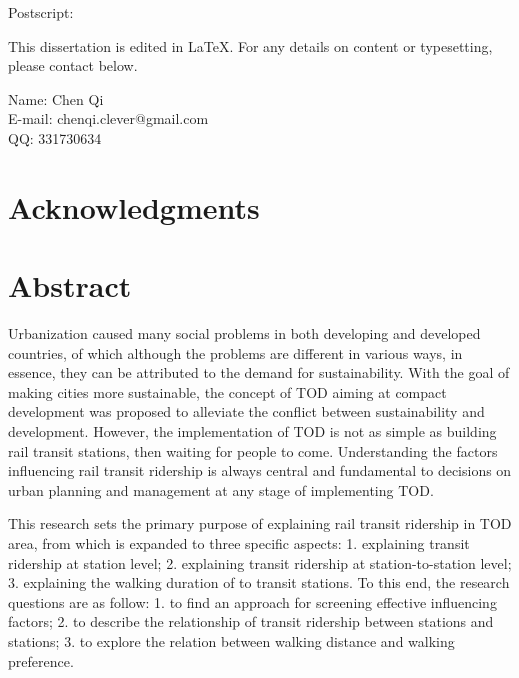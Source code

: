 \documentclass[12pt, twoside, a4paper]{book} %
\renewcommand{\baselinestretch}{1.5} %
\begin{document}
Postscript:

This dissertation is edited in \LaTeX. For any details on content or typesetting, please contact below.

\begin{flushright}
Name: Chen Qi \\
E-mail: chenqi.clever@gmail.com \\
QQ: 331730634 \\
\end{flushright}

\renewcommand{\baselinestretch}{1.2} %
\fontsize{14pt}{14pt} %
\selectfont

\tableofcontents %
\listoffigures %
\listoftables %

\frontmatter

\renewcommand{\baselinestretch}{1.8} %
\fontsize{13pt}{13pt} %
\selectfont

\chapter{Acknowledgments}

\chapter{Abstract}
Urbanization caused many social problems in both developing and developed countries, of which although the problems are different in various ways, in essence, they can be attributed to the demand for sustainability. With the goal of making cities more sustainable, the concept of TOD aiming at compact development was proposed to alleviate the conflict between sustainability and development. However, the implementation of TOD is not as simple as building rail transit stations, then waiting for people to come. Understanding the factors influencing rail transit ridership is always central and fundamental to decisions on urban planning and management at any stage of implementing TOD.

This research sets the primary purpose of explaining rail transit ridership in TOD area, from which is expanded to three specific aspects: 1. explaining transit ridership at station level; 2. explaining transit ridership at station-to-station level; 3. explaining the walking duration of to transit stations. To this end, the research questions are as follow: 1. to find an approach for screening effective influencing factors; 2. to describe the relationship of transit ridership between stations and stations; 3. to explore the relation between walking distance and walking preference.
\end{document}
